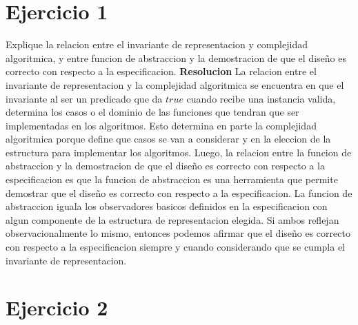 \documentclass[10pt,a4paper]{article}
\begin{document}
\maketitle

\section{Ejercicio 1}

Explique la relacion  entre el invariante de representacion y complejidad algoritmica, y entre funcion de abstraccion y la demostracion de que el diseño es correcto con respecto a la especificacion.  
\newline
\newline
\textbf{Resolucion}
\newline
\newline
La relacion entre el invariante de representacion y la complejidad algoritmica se encuentra en que el invariante al ser un predicado que da $true$ cuando recibe una instancia valida, determina los casos o el dominio de las funciones que tendran que ser implementadas en los algoritmos. Esto determina en parte la complejidad algoritmica porque define que casos se van a considerar y en la eleccion de la estructura para implementar los algoritmos. 
\newline
\newline
Luego, la relacion entre la funcion de abstraccion y la demostracion de que el diseño es correcto con respecto a la especificacion es que la funcion de abstraccion es una herramienta que permite demostrar que el diseño es correcto con respecto a la especificacion. La funcion de abstraccion iguala los observadores basicos definidos en la especificacion con algun componente de la estructura de representacion elegida. Si ambos reflejan observacionalmente lo mismo, entonces podemos afirmar que el diseño es correcto con respecto a la especificacion siempre y cuando considerando que se cumpla el invariante de representacion.
\newpage

\section{Ejercicio 2}
\end{document}
